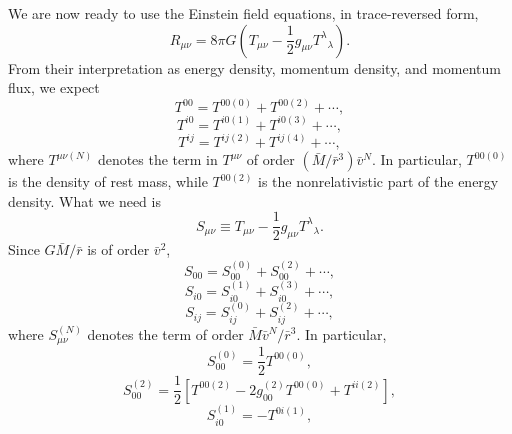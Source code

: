 We are now ready to use the Einstein field equations, in trace-reversed form,
\begin{equation}
  R_{\mu\nu}
  =
  8\pi G\left(T_{\mu\nu}-\frac12g_{\mu\nu}T^\lambda{}_\lambda\right).
  \tag{9.1.41}\label{eq:9.1.41}
\end{equation}
From their interpretation as energy density, momentum density, and momentum
flux, we expect
\begin{equation}
  T^{00}=T^{00(0)}+T^{00(2)}+\cdots,
  \tag{9.1.42}\label{eq:9.1.42}
\end{equation}
\begin{equation}
  T^{i0}=T^{i0(1)}+T^{i0(3)}+\cdots,
  \tag{9.1.43}\label{eq:9.1.43}
\end{equation}
\begin{equation}
  T^{ij}=T^{ij(2)}+T^{ij(4)}+\cdots,
  \tag{9.1.44}\label{eq:9.1.44}
\end{equation}
where \(T^{\mu\nu(N)}\) denotes the term in \(T^{\mu\nu}\) of order
\((\bar M/\bar r^3)\bar v^N\). In particular, \(T^{00(0)}\) is the
density of rest mass, while \(T^{00(2)}\) is the nonrelativistic part of
the energy density. What we need is
\begin{equation}
  S_{\mu\nu}\equiv
  T_{\mu\nu}-\frac12g_{\mu\nu}T^\lambda{}_\lambda.
  \tag{9.1.45}\label{eq:9.1.45}
\end{equation}
Since \(G\bar M/\bar r\) is of order \(\bar v^2\),
\begin{equation}
  S_{00}=S_{00}^{(0)}+S_{00}^{(2)}+\cdots,
  \tag{9.1.46}\label{eq:9.1.46}
\end{equation}
\begin{equation}
  S_{i0}=S_{i0}^{(1)}+S_{i0}^{(3)}+\cdots,
  \tag{9.1.47}\label{eq:9.1.47}
\end{equation}
\begin{equation}
  S_{ij}=S_{ij}^{(0)}+S_{ij}^{(2)}+\cdots,
  \tag{9.1.48}\label{eq:9.1.48}
\end{equation}
where \(S_{\mu\nu}^{(N)}\) denotes the term of order
\(\bar M\bar v^N/\bar r^3\). In particular,
\begin{equation}
  S_{00}^{(0)}=\frac12T^{00(0)},
  \tag{9.1.49}\label{eq:9.1.49}
\end{equation}
\begin{equation}
  S_{00}^{(2)}
  =
  \frac12\left[
    T^{00(2)}
    -2g_{00}^{(2)}T^{00(0)}
    +T^{ii(2)}
  \right],
  \tag{9.1.50}\label{eq:9.1.50}
\end{equation}
\begin{equation}
  S_{i0}^{(1)}=-T^{0i(1)},
  \tag{9.1.51}\label{eq:9.1.51}
\end{equation}
